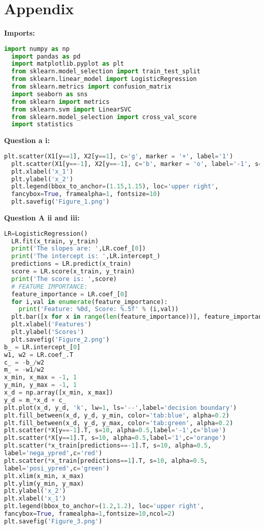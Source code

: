\documentclass[10pt]{article}
\begin{document}
\section*{Appendix}
\textbf{Imports:}
\begin{lstlisting}[language=Python]
  import numpy as np
  import pandas as pd
  import matplotlib.pyplot as plt
  from sklearn.model_selection import train_test_split
  from sklearn.linear_model import LogisticRegression
  from sklearn.metrics import confusion_matrix
  import seaborn as sns
  from sklearn import metrics
  from sklearn.svm import LinearSVC
  from sklearn.model_selection import cross_val_score
  import statistics
\end{lstlisting}
\textbf{Question a i:}
\begin{lstlisting}[language=Python]
  plt.scatter(X1[y==1], X2[y==1], c='g', marker = '+', label='1')
  plt.scatter(X1[y==-1], X2[y==-1], c='b', marker = 'o', label='-1', s=10)
  plt.xlabel('x_1')
  plt.ylabel('x_2')
  plt.legend(bbox_to_anchor=(1.15,1.15), loc='upper right', 
  fancybox=True, framealpha=1, fontsize=10)
  plt.savefig('Figure_1.png')
\end{lstlisting}
\textbf{Question A ii and iii:}
\begin{lstlisting}[language=Python]
  LR=LogisticRegression()
  LR.fit(x_train, y_train)
  print('The slopes are: ',LR.coef_[0])
  print('The intercept is: ',LR.intercept_)
  predictions = LR.predict(x_train)
  score = LR.score(x_train, y_train)
  print('The score is: ',score)
  # FEATURE IMPORTANCE:
  feature_importance = LR.coef_[0]
  for i,val in enumerate(feature_importance):
    print('Feature: %0d, Score: %.5f' % (i,val))
  plt.bar([x for x in range(len(feature_importance))], feature_importance)
  plt.xlabel('Features')
  plt.ylabel('Scores')
  plt.savefig('Figure_2.png')
b_ = LR.intercept_[0]
w1, w2 = LR.coef_.T
c_ = -b_/w2
m_ = -w1/w2
x_min, x_max = -1, 1
y_min, y_max = -1, 1
x_d = np.array([x_min, x_max])
y_d = m_*x_d + c_
plt.plot(x_d, y_d, 'k', lw=1, ls='--',label='decision boundary')
plt.fill_between(x_d, y_d, y_min, color='tab:blue', alpha=0.2)
plt.fill_between(x_d, y_d, y_max, color='tab:green', alpha=0.2)
plt.scatter(*X[y==-1].T, s=10, alpha=0.5,label='-1',c='blue')
plt.scatter(*X[y==1].T, s=10, alpha=0.5,label='1',c='orange')
plt.scatter(*x_train[predictions==-1].T, s=10, alpha=0.5, 
label='nega_ypred',c='red')
plt.scatter(*x_train[predictions==1].T, s=10, alpha=0.5,
label='posi_ypred',c='green')
plt.xlim(x_min, x_max)
plt.ylim(y_min, y_max)
plt.ylabel('x_2')
plt.xlabel('x_1')
plt.legend(bbox_to_anchor=(1.2,1.2), loc='upper right', 
fancybox=True, framealpha=1,fontsize=10,ncol=2)
plt.savefig('Figure_3.png')
\end{lstlisting}
\end{document}
